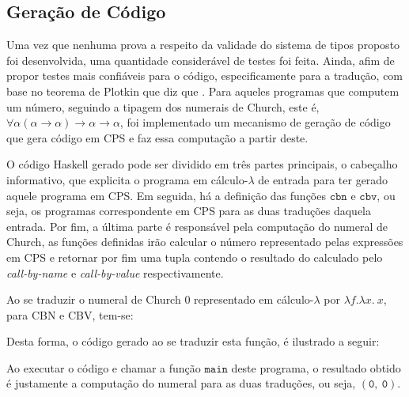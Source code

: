 \subsection{Geração de Código}\label{subsec:cps-code-gen}
Uma vez que nenhuma prova a respeito da validade do sistema de tipos proposto foi desenvolvida, uma quantidade considerável de testes foi feita.
Ainda, afim de propor testes mais confiáveis para o código, especificamente para a tradução, com base no teorema de Plotkin que diz que .
Para aqueles programas que computem um número, seguindo a tipagem dos numerais de Church, este é, $\forall\alpha(\alpha \to \alpha) \to \alpha \to \alpha$, foi implementado um mecanismo de geração de código que gera código em CPS e faz essa computação a partir deste.


O código Haskell gerado pode ser dividido em três partes principais, o cabeçalho informativo, que explicita o programa em cálculo-$\lambda$ de entrada para ter gerado aquele programa em CPS.
Em seguida, há a definição das funções $\mathtt{cbn}$ e $\mathtt{cbv}$, ou seja, os programas correspondente em CPS para as duas traduções daquela entrada.
Por fim, a última parte é responsável pela computação do numeral de Church, as funções definidas irão calcular o número representado pelas expressões em CPS e retornar por fim uma tupla contendo o resultado do calculado pelo \textit{call-by-name} e \textit{call-by-value} respectivamente.

Ao se traduzir o numeral de Church 0 representado em cálculo-$\lambda$ por $\lambda f.\lambda x.\ x$, para CBN e CBV, tem-se:


Desta forma, o código gerado ao se traduzir esta função, é ilustrado a seguir:

Ao executar o código e chamar a função $\mathtt{main}$ deste programa, o resultado obtido é justamente a computação do numeral para as duas traduções, ou seja, $\mathtt{(0,\ 0)}$.
